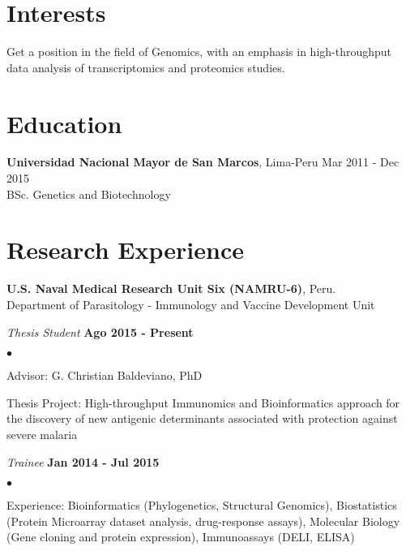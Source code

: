 \documentclass[margin,line]{res}
\newenvironment{list1}{
  \begin{list}{\ding{113}}{%
      \setlength{\itemsep}{0in}
      \setlength{\parsep}{0in} \setlength{\parskip}{0in}
      \setlength{\topsep}{0in} \setlength{\partopsep}{0in}
      \setlength{\leftmargin}{0.17in}}}{\end{list}}
\newenvironment{list2}{
  \begin{list}{$\bullet$}{%
      \setlength{\itemsep}{0in}
      \setlength{\parsep}{0in} \setlength{\parskip}{0in}
      \setlength{\topsep}{0in} \setlength{\partopsep}{0in}
      \setlength{\leftmargin}{0.2in}}}{\end{list}}
\begin{document}
\address{Calle Tambo Huascar 201, San Miguel, Lima-Peru}
\address{\textit{contact:} avallecam@gmail.com or (+51)950951722}

\begin{resume}

\section{\sc Interests}

Get a position in the field of Genomics, with an emphasis in high-throughput data analysis of transcriptomics and proteomics studies.\\

\section{\sc Education}
{\bf Universidad Nacional Mayor de San Marcos}, Lima-Peru \hfill Mar 2011 - Dec 2015\\
BSc. Genetics and Biotechnology\\

\section{\sc Research Experience}

{\bf U.S. Naval Medical Research Unit Six (NAMRU-6)}, Peru.\\
Department of Parasitology - Immunology and Vaccine Development Unit\\
\vspace*{-.1in}
\begin{list1}
	\item[] {\em Thesis Student} \hfill {\bf Ago 2015 - Present}\\
	\vspace*{-.1in}
	\begin{list2} %
		\item Advisor: G. Christian Baldeviano, PhD
		\item Thesis Project: High-throughput Immunomics and Bioinformatics approach for the discovery of new antigenic determinants associated with protection against severe malaria\\
	\end{list2}
	\vspace*{-.1in}
	\item[] {\em Trainee} \hfill {\bf Jan 2014 - Jul 2015}\\
	\vspace*{-.1in}
	\begin{list2} %
		\item Experience: Bioinformatics (Phylogenetics, Structural Genomics), Biostatistics (Protein Microarray dataset analysis, drug-response assays), Molecular Biology (Gene cloning and protein expression), Immunoassays (DELI, ELISA)
	\end{list2}
\end{list1}


\end{resume}
\end{document}
